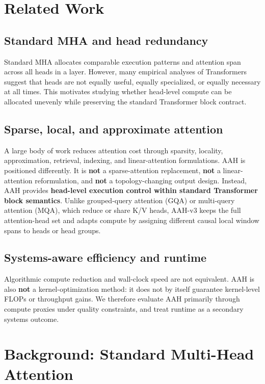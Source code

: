 \documentclass[11pt]{article}
\begin{document}
\section{Related Work}

\subsection{Standard MHA and head redundancy}

Standard MHA allocates comparable execution patterns and attention span across all heads in a layer. However, many empirical analyses of Transformers suggest that heads are not equally useful, equally specialized, or equally necessary at all times. This motivates studying whether head-level compute can be allocated unevenly while preserving the standard Transformer block contract.

\subsection{Sparse, local, and approximate attention}

A large body of work reduces attention cost through sparsity, locality, approximation, retrieval, indexing, and linear-attention formulations. AAH is positioned differently. It is \textbf{not} a sparse-attention replacement, \textbf{not} a linear-attention reformulation, and \textbf{not} a topology-changing output design. Instead, AAH provides \textbf{head-level execution control within standard Transformer block semantics}. Unlike grouped-query attention (GQA) or multi-query attention (MQA), which reduce or share K/V heads, AAH-v3 keeps the full attention-head set and adapts compute by assigning different causal local window spans to heads or head groups.

\subsection{Systems-aware efficiency and runtime}

Algorithmic compute reduction and wall-clock speed are not equivalent. AAH is also \textbf{not} a kernel-optimization method: it does not by itself guarantee kernel-level FLOPs or throughput gains. We therefore evaluate AAH primarily through compute proxies under quality constraints, and treat runtime as a secondary systems outcome.

\section{Background: Standard Multi-Head Attention}
\end{document}
